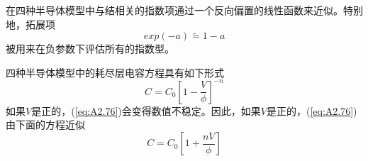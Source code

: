 在四种半导体模型中与结相关的指数项通过一个反向偏置的线性函数来近似。特别地，拓展项
\begin{equation}
    exp(-a) \widetilde{=} 1-a
    \label{eq:A2.75}
\end{equation}
被用来在负参数下评估所有的指数型。

四种半导体模型中的耗尽层电容方程具有如下形式
\begin{equation}
    C = C_0[1-\frac{V}{\phi}]^{-n}
    \label{eq:A2.76}
\end{equation}
如果$V$是正的，(\ref{eq:A2.76})会变得数值不稳定。因此，如果$V$是正的，(\ref{eq:A2.76})由下面的方程近似
\begin{equation}
    C = C_0[1 + \frac{nV}{\phi}]
    \label{eq:A2.77}
\end{equation}